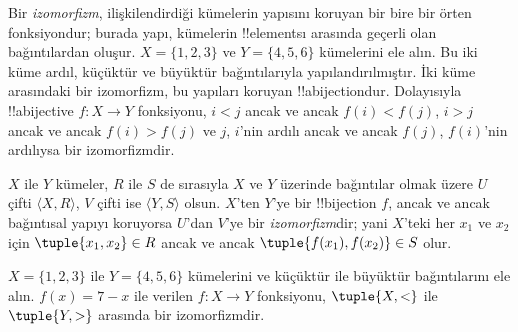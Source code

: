 \documentclass[../../../include/open-logic-section]{subfiles}
\begin{document}

\begin{explain}
Bir \emph{izomorfizm}, ilişkilendirdiği kümelerin yapısını koruyan bir
bire bir örten fonksiyondur; burada yapı, kümelerin !!{element}s{}ı arasında
geçerli olan bağıntılardan oluşur. $X=\{1,2,3\}$ ve $Y=\{4,5,6\}$ kümelerini
ele alın. Bu iki küme ardıl, küçüktür ve büyüktür bağıntılarıyla
yapılandırılmıştır. İki küme arasındaki bir izomorfizm, bu yapıları koruyan
!!a{bijection}{}dur. Dolayısıyla !!a{bijective} $f \colon X \to Y$ fonksiyonu,
$i<j$ ancak ve ancak $f(i)<f(j)$, $i>j$ ancak ve ancak $f(i)>f(j)$ ve $j$,
$i$'nin ardılı ancak ve ancak $f(j)$, $f(i)$'nin ardılıysa bir izomorfizmdir.
\end{explain}

\begin{defn}[İzomorfizm]
$X$ ile $Y$ kümeler, $R$ ile $S$ de sırasıyla $X$ ve $Y$ üzerinde bağıntılar
olmak üzere $U$ çifti $\langle X, R\rangle$, $V$ çifti ise $\langle Y,
S\rangle$ olsun. $X$'ten $Y$'ye bir !!{bijection} $f$, ancak ve ancak
bağıntısal yapıyı koruyorsa $U$'dan $V$'ye bir \emph{izomorfizm}dir; yani
$X$'teki her $x_{1}$ ve $x_{2}$ için $\tuple{x_1,x_2} \in R$ ancak ve ancak
$\tuple{f(x_1),f(x_2)} \in S$ olur.
\end{defn}

\begin{ex}
$X=\{1,2,3\}$ ile $Y=\{4,5,6\}$ kümelerini ve küçüktür ile büyüktür
bağıntılarını ele alın. $f(x) = 7-x$ ile verilen $f\colon X \to Y$ fonksiyonu,
$\tuple{X,<}$ ile $\tuple{Y,>}$ arasında bir izomorfizmdir.
\end{ex}
\end{document}
